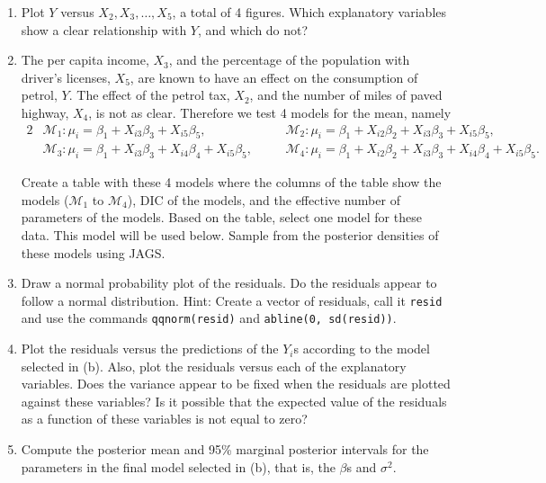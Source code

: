 \documentclass[
]{homework}
\begin{document}
\begin{enumerate}[label = (\alph*)]
  \item Plot $Y$ versus $X_2, X_3, \ldots, X_5$, a total of 4 figures. Which explanatory variables show a clear relationship with $Y$, and which do not?
  
  \item The per capita income, $X_3$, and the percentage of the population with driver's licenses, $X_5$, are known to have an effect on the consumption of
  petrol, $Y$. The effect of the petrol tax, $X_2$, and the number of miles of paved highway, $X_4$, is not as clear. Therefore we test 4 models for the
  mean, namely
  \begin{alignat*}{2}
    &\mathcal M_1: \mu_i = \beta_1 + X_{i3}\beta_3 + X_{i5}\beta_5, \quad &&\mathcal M_2: \mu_i = \beta_1 + X_{i2}\beta_2 + X_{i3}\beta_3 + X_{i5}\beta_5, \\
    &\mathcal M_3: \mu_i = \beta_1 + X_{i3}\beta_3 + X_{i4}\beta_4 + X_{i5}\beta_5, \quad &&\mathcal M_4: \mu_i = \beta_1 + X_{i2}\beta_2 + X_{i3}\beta_3 + X_{i4}\beta_4 + X_{i5}\beta_5.
  \end{alignat*}
  
  Create a table with these 4 models where the columns of the table show the models ($\mathcal M_1$ to $\mathcal M_4$), DIC of the models, and the effective
  number of parameters of the models. Based on the table, select one model for these data. This model will be used below. Sample from the posterior densities of
  these models using \textsf{JAGS}.
  
  \item Draw a normal probability plot of the residuals. Do the residuals appear to follow a normal distribution. Hint: Create a vector of residuals, call it \texttt{resid}
  and use the commands \texttt{qqnorm(resid)} and \texttt{abline(0, sd(resid))}.
  
  \item Plot the residuals versus the predictions of the $Y_i$s according to the model selected in (b). Also, plot the residuals versus each of the explanatory variables.
  Does the variance appear to be fixed when the residuals are plotted against these variables? Is it possible that the expected value of the residuals as a function of these
  variables is not equal to zero?
  
  \item Compute the posterior mean and 95\% marginal posterior intervals for the parameters in the final model selected in (b), that is, the $\beta$s and $\sigma^2$.
  

\end{enumerate}
\end{document}
